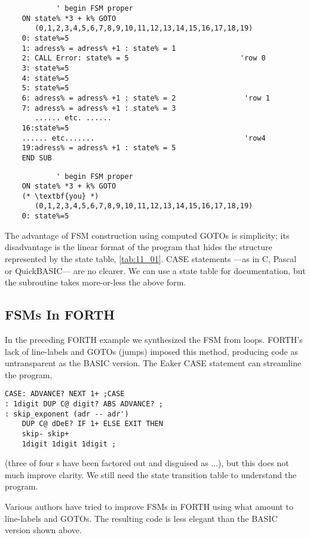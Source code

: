 \begin{verbatim}
            ' begin FSM proper
    ON state% *3 + k% GOTO
       (0,1,2,3,4,5,6,7,8,9,10,11,12,13,14,15,16,17,18,19)
    0: state%=5
    1: adress% = adress% +1 : state% = 1
    2: CALL Error: state% = 5                          'row 0
    3: state%=5
    4: state%=5
    5: state%=5
    6: adress% = adress% +1 : state% = 2                'row 1
    7: adress% = adress% +1 : state% = 3
       ...... etc. ......
    16:state%=5
    ...... etc.......                                   'row4
    19:adress% = adress% +1 : state% = 5
    END SUB
\end{verbatim}
\begin{lstlisting}
            ' begin FSM proper
    ON state% *3 + k% GOTO
    (* \textbf{you} *)
       (0,1,2,3,4,5,6,7,8,9,10,11,12,13,14,15,16,17,18,19)
    0: state%=5

\end{lstlisting}

The advantage of FSM construction using computed GOTOs is simplicity; its disadvantage is the linear format of the program that hides the structure represented by the state table, \ref{tab:11_01}. CASE statements —as in C, Pascal or QuickBASIC— are no clearer. We can use a state table for documentation, but the subroutine takes more-or-less the above form.

\subsection{FSMs In FORTH}
In the preceding FORTH example we synthesized the FSM from  loops. FORTH's lack of line-labels and GOTOs (jumps) imposed this method, producing code as untransparent as the BASIC version. The Eaker CASE statement can streamline the program,

\begin{lstlisting}
CASE: ADVANCE? NEXT 1+ ;CASE
: 1digit DUP C@ digit? ABS ADVANCE? ;
: skip_exponent (adr -- adr')
    DUP C@ dDeE? IF 1+ ELSE EXIT THEN
    skip- skip+
    1digit 1digit 1digit ;
\end{lstlisting}

(three of four s have been factored out and disguised as ...), but this does not much improve clarity. We still need the state transition table to understand the program.

Various authors have tried to improve FSMs in FORTH using what amount to line-labels and GOTOs. The resulting code is less elegant than the BASIC version shown above.

